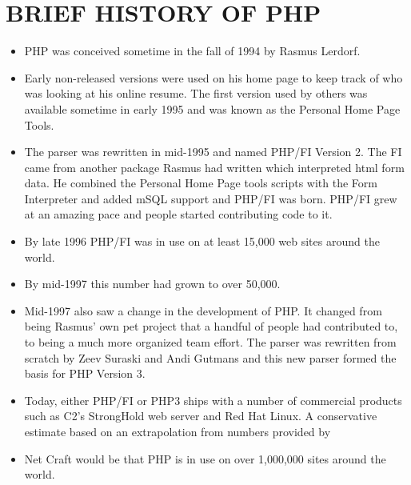 \documentclass{article}
\begin{document}
\section*{BRIEF HISTORY OF PHP}
\begin{itemize}
	\item PHP was conceived sometime in the fall of 1994 by Rasmus Lerdorf.
	\item Early non-released versions were used on his home page to keep track of who was looking at his online resume. The first version used by others was available sometime in early 1995 and was known as the Personal Home Page Tools.  
	\item The parser was rewritten in mid-1995 and named PHP/FI Version 2. The FI came from another package Rasmus had written which interpreted html form data. He combined the Personal Home Page tools scripts with the Form Interpreter and added mSQL support and PHP/FI was born. PHP/FI grew at an amazing pace and people started contributing code to it.
	\item By late 1996 PHP/FI was in use on at least 15,000 web sites around the world.
	\item By mid-1997 this number had grown to over 50,000. 
	\item Mid-1997 also saw a change in the development of PHP. It changed from being Rasmus' own pet project that a handful of people had contributed to, to being a much more organized team effort. The parser was rewritten from scratch by Zeev Suraski and Andi Gutmans and this new parser formed the basis for PHP Version 3.
	\item Today, either PHP/FI or PHP3 ships with a number of commercial products such as C2's StrongHold web server and Red Hat Linux. A conservative estimate based on an extrapolation from numbers provided by \item Net Craft would be that PHP is in use on over 1,000,000 sites around the world.
	
\end{itemize}
\newpage
\pagecolor{black}
\color{white}
\end{document}
